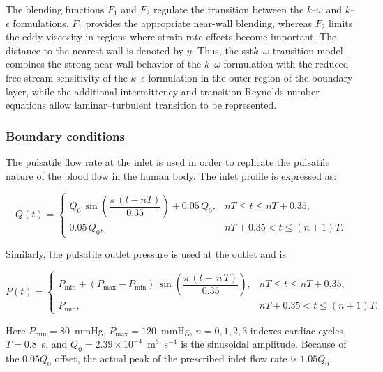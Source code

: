 \documentclass[12pt,a4paper]{article}
\newcommand{\SST}{\ac{sst}\xspace}
\theoremstyle{definition}
\numberwithin{equation}{section}
\begin{document}
The blending functions \(F_1\) and \(F_2\) regulate the transition between the \(k\)--\(\omega\) and \(k\)--\(\epsilon\) formulations. \(F_1\) provides the appropriate near-wall blending, whereas \(F_2\) limits the eddy viscosity in regions where strain-rate effects become important. The distance to the nearest wall is denoted by \(y\). Thus, the \SST \(k\)--\(\omega\) transition model combines the strong near-wall behavior of the \(k\)--\(\omega\) formulation with the reduced free-stream sensitivity of the \(k\)--\(\epsilon\) formulation in the outer region of the boundary layer, while the additional intermittency and transition-Reynolds-number equations allow laminar--turbulent transition to be represented.




\subsubsection{Boundary conditions}
The pulsatile flow rate at the inlet is used in order to replicate the pulsatile nature of the blood flow in the human body. The inlet profile is expressed as:

\begin{equation}
Q(t)=
\begin{cases}
Q_0\,\sin\!\left(\dfrac{\pi\,(t-nT)}{0.35}\right)+0.05\,Q_0,
& nT \le t \le nT+0.35, \\[6pt]
0.05\,Q_0,
& nT+0.35 < t \le (n+1)T.
\end{cases}
\label{eq:inlet_waveform}
\end{equation}


Similarly, the pulsatile outlet pressure is used at the outlet and is

\begin{equation}
P(t) =
\begin{cases} 
P_\mathrm{min} + \left(P_\mathrm{max} - P_\mathrm{min}\right) \, \sin\left(\dfrac{\pi \, (t - \, n \, T)}{0.35}\right), & nT \le t \le nT+0.35, \\
P_\mathrm{min}, & nT+0.35 < t \le (n+1)T.
\end{cases}
\label{eq:outlet_waveform}
\end{equation}

Here $P_{\mathrm{min}}=80$~mmHg, $P_{\mathrm{max}}=120$~mmHg, $n=0,1,2,3$ indexes cardiac cycles, $T=0.8$~s, and $Q_0=2.39\times10^{-4}$~m$^3$~s$^{-1}$ is the sinusoidal amplitude. Because of the $0.05Q_0$ offset, the actual peak of the prescribed inlet flow rate is $1.05Q_0$.
\end{document}
